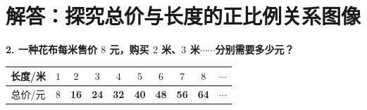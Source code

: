 \documentclass[12pt, a4paper]{ctexrep}
\begin{document}

\section{解答：探究总价与长度的正比例关系图像}

\vspace{0.6cm}

\noindent\textbf{2. 一种花布每米售价 $8$ 元，购买 $2$ 米、$3$ 米$\cdots\cdots$分别需要多少元？}

\vspace{0.3cm}
\begin{center}
\renewcommand{\arraystretch}{1.5}
\begin{tabular}{|c|c|c|c|c|c|c|c|c|c|}
\hline
长度/米 & $1$ & $2$ & $3$ & $4$ & $5$ & $6$ & $7$ & $8$ & $\cdots$ \\
\hline
总价/元 & $8$ 
  & \textcolor{blue!80!black}{\textbf{16}}
  & \textcolor{blue!80!black}{\textbf{24}}
  & \textcolor{blue!80!black}{\textbf{32}}
  & \textcolor{blue!80!black}{\textbf{40}}
  & \textcolor{blue!80!black}{\textbf{48}}
  & \textcolor{blue!80!black}{\textbf{56}}
  & \textcolor{blue!80!black}{\textbf{64}}
  & $\cdots$ \\
\hline
\end{tabular}
\end{center}

\vspace{0.6cm}
\end{document}

